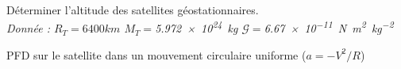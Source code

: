 \begin{Exercise}[title=Satellite Géostationnaire]
	\Question Déterminer l'altitude des satellites géostationnaires.\\
	\emph{Donnée : $R_T=6400 km$ $M_T=$\SI{5,972e24}{\kg} $\mathcal{G}=$\SI{6.67e-11}{\N\m^{2}\kg^{-2}}}
\end{Exercise}
\begin{Answer}
	PFD sur le satellite dans un mouvement circulaire uniforme ($a =-V^2/R$)
\end{Answer}
